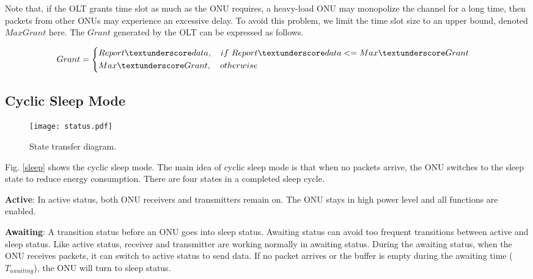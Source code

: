 \documentclass[journal]{IEEEtran}
\begin{document}
Note that, if the OLT grants time slot as much as the ONU requires, a heavy-load ONU may monopolize the channel for a long time, then packets from other ONUs may experience an excessive delay. To avoid this problem, we limit the time slot size to an upper bound, denoted $Max$\textunderscore $Grant$ here. The $Grant$ generated by the OLT can be expressed as follows.

\begin{footnotesize}
\begin{equation}
Grant  =  
\left\{
\begin{aligned}
& Report\textunderscore data, \quad if \ Report\textunderscore data <= Max\textunderscore Grant & \\
& Max\textunderscore Grant, \quad otherwise & \\
\end{aligned}
\right.
\end{equation}
\end{footnotesize}



\subsection{Cyclic Sleep Mode}

\begin{figure}[t]
    \centering 
        \texttt{[image: status.pdf]}\\ 
    \caption{ State transfer diagram.}
    \label{status}
\end{figure}


Fig. \ref{sleep} shows the cyclic sleep mode. The main idea of cyclic sleep mode is that when no packets arrive, the ONU switches to the sleep state to reduce energy consumption. There are four states in a completed sleep cycle.

\textbf{Active}: In active status, both ONU receivers and transmitters remain on. The ONU stays in high power level and all functions are enabled.

\textbf{Awaiting}: A transition status before an ONU goes into sleep status. Awaiting status can avoid too frequent transitions between active and sleep status. Like active status, receiver and transmitter are working normally in awaiting status. During the awaiting status, when the ONU receives packets, it can switch to active status to send data. If no packet arrives or the buffer is empty during the awaiting time ($T_{awaiting}$), the ONU will turn to sleep status.
\end{document}
